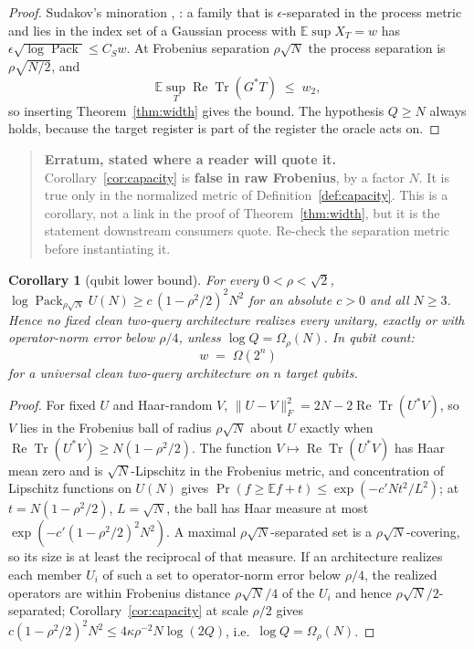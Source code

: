 \documentclass[11pt,a4paper]{article}
\theoremstyle{plain}
\newtheorem{corollary}[theorem]{Corollary}
\theoremstyle{definition}
\theoremstyle{remark}
\DeclareMathOperator{\Tr}{Tr}
\DeclareMathOperator{\Pack}{Pack}
\newcommand{\E}{\mathbb E}
\newcommand{\Fro}[1]{\|#1\|_F}
\newenvironment{callout}[1]{\par\medskip\noindent\begin{quote}\small\textbf{#1}\ }{\end{quote}\medskip}
\begin{document}
\begin{proof}
Sudakov's minoration \cite[Thm~7.4.1]{Ver18}, \cite{Tal14}: a family that is $\epsilon$-separated in the
process metric and lies in the index set of a Gaussian process with $\E\sup X_T=w$ has
$\epsilon\sqrt{\log\Pack}\le C_Sw$. At Frobenius separation $\rho\sqrt N$ the process
separation is $\rho\sqrt{N/2}$, and
\[
\E\sup_T\operatorname{Re}\Tr(G^{*}T)\;\le\;w_2,
\]
so inserting Theorem~\ref{thm:width} gives the bound. The hypothesis $Q\ge N$ always holds,
because the target register is part of the register the oracle acts on.
\end{proof}

\begin{callout}{Erratum, stated where a reader will quote it.}
Corollary~\ref{cor:capacity} is \textbf{false in raw Frobenius}, by a factor $N$. It is true
only in the normalized metric of Definition~\ref{def:capacity}. This is a corollary, not a
link in the proof of Theorem~\ref{thm:width}, but it is the statement downstream consumers
quote. Re-check the separation metric before instantiating it.
\end{callout}

\begin{corollary}[qubit lower bound]\label{cor:qubits}
For every $0<\rho<\sqrt2$, $\log\Pack_{\rho\sqrt N}U(N)\ge c\,(1-\rho^2/2)^2N^2$ for an
absolute $c>0$ and all $N\ge3$. Hence no fixed clean two-query architecture realizes every unitary, exactly
or with operator-norm error below $\rho/4$, unless $\log Q=\Omega_\rho(N)$. In qubit count:
\[
\boxed{\;w\;=\;\Omega(2^n)\;}
\]
for a universal clean two-query architecture on $n$ target qubits.
\end{corollary}

\begin{proof}
For fixed $U$ and Haar-random $V$, $\Fro{U-V}^2=2N-2\operatorname{Re}\Tr(U^{*}V)$, so $V$ lies
in the Frobenius ball of radius $\rho\sqrt N$ about $U$ exactly when
$\operatorname{Re}\Tr(U^{*}V)\ge N(1-\rho^2/2)$. The function $V\mapsto\operatorname{Re}\Tr(U^{*}V)$
has Haar mean zero and is $\sqrt N$-Lipschitz in the Frobenius metric, and concentration of
Lipschitz functions on $U(N)$ \cite[Thm~5.17]{Mec19} gives $\Pr(f\ge\E f+t)\le\exp(-c'Nt^2/L^2)$;
at $t=N(1-\rho^2/2)$, $L=\sqrt N$, the ball has Haar measure at most
$\exp(-c'(1-\rho^2/2)^2N^2)$. A maximal $\rho\sqrt N$-separated set is a
$\rho\sqrt N$-covering, so its size is at least the reciprocal of that measure. If an
architecture realizes each member $U_i$ of such a set to operator-norm error below $\rho/4$,
the realized operators are within Frobenius distance $\rho\sqrt N/4$ of the $U_i$ and hence
$\rho\sqrt N/2$-separated; Corollary~\ref{cor:capacity} at scale $\rho/2$ gives
$c(1-\rho^2/2)^2N^2\le4\kappa\rho^{-2}N\log(2Q)$, i.e.\ $\log Q=\Omega_\rho(N)$.
\end{proof}
\end{document}
